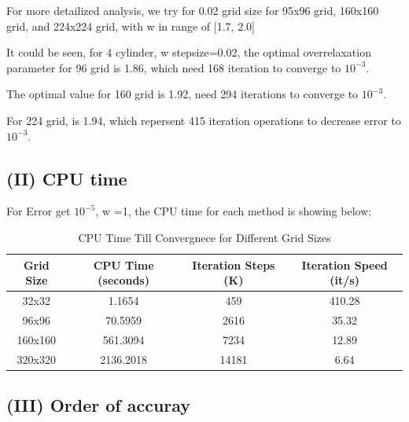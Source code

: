 \documentclass[12pt]{article}
\begin{document}
For more detailized analysis, we try for 0.02 grid size for 95x96 grid, 160x160 grid,
and 224x224 grid, with w in range of [1.7, 2.0]

It could be seen, for 4 cylinder, w stepsize=0.02, the optimal overrelaxation
parameter for 96 grid is 1.86, which need 168 iteration to converge to $10^{-3}$.

The optimal value for 160 grid is 1.92, need 294 iterations to converge to $10^{-3}$.

For 224 grid, is 1.94, which repersent 415 iteration operations to decrease error
to $10^{-3}$.


    



\subsection{(II) CPU time}


For Error get $10^{-5}$, w =1, the CPU time for each method is showing below:


\begin{table}[ht]
    \centering
    \begin{tabular}{c|c | c | c}
    \hline
    Grid Size & CPU Time (seconds) & Iteration Steps (K) & Iteration Speed (it/s)\\ \hline
    32x32     & 1.1654             & 459                 & 410.28  \\ \hline
    96x96     & 70.5959            & 2616                & 35.32   \\ \hline
    160x160   & 561.3094           & 7234                & 12.89   \\ \hline
    320x320   & 2136.2018          & 14181               & 6.64    \\ \hline
    \end{tabular}
    \caption{CPU Time Till Convergnece for Different Grid Sizes}
    \label{tab:cpu_time}
\end{table}
    


\subsection{(III) Order of accuray}
\end{document}
